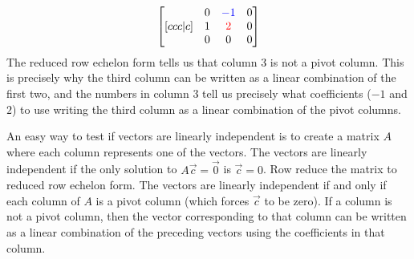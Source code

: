 {\begin{example}
$$\begin{bmatrix}[ccc|c]
&\begin{matrix} 0\\1\\0 \end{matrix}
&\begin{matrix} {\color{blue}-1}\\{\color{red}2}\\0 \end{matrix}
&\begin{matrix} 0\\0\\0 \end{matrix}
\end{bmatrix}
$$
The reduced row echelon form tells us that column 3 is not a pivot column.  This is precisely why the third column can be written as a linear combination of the first two, and the numbers in column 3 tell us precisely what coefficients ($-1$ and $2$) to use writing the third column as a linear combination of the pivot columns. 
\end{example}

An easy way to test if vectors are linearly independent is to create a matrix $A$ where each column represents one of the vectors. 
The vectors are linearly independent if the only solution to $A\vec c=\vec 0$ is $\vec c=0$. Row reduce the matrix to reduced row echelon form. 
The vectors are linearly independent if and only if each column of $A$ is a pivot column (which forces $\vec c$ to be zero). 
If a column is not a pivot column, then the vector corresponding to that column can be written as a linear combination of the preceding vectors using the coefficients in that column. 

}
